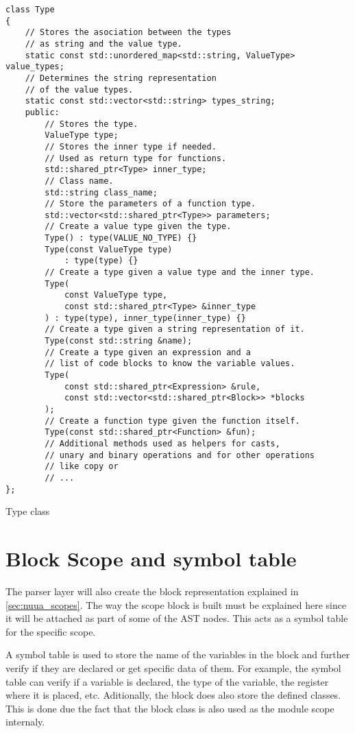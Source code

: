 \begin{listing}[H]
\begin{verbatim}
class Type
{
    // Stores the asociation between the types
    // as string and the value type.
    static const std::unordered_map<std::string, ValueType> value_types;
    // Determines the string representation
    // of the value types.
    static const std::vector<std::string> types_string;
    public:
        // Stores the type.
        ValueType type;
        // Stores the inner type if needed.
        // Used as return type for functions.
        std::shared_ptr<Type> inner_type;
        // Class name.
        std::string class_name;
        // Store the parameters of a function type.
        std::vector<std::shared_ptr<Type>> parameters;
        // Create a value type given the type.
        Type() : type(VALUE_NO_TYPE) {}
        Type(const ValueType type)
            : type(type) {}
        // Create a type given a value type and the inner type.
        Type(
            const ValueType type,
            const std::shared_ptr<Type> &inner_type
        ) : type(type), inner_type(inner_type) {}
        // Create a type given a string representation of it.
        Type(const std::string &name);
        // Create a type given an expression and a
        // list of code blocks to know the variable values.
        Type(
            const std::shared_ptr<Expression> &rule,
            const std::vector<std::shared_ptr<Block>> *blocks
        );
        // Create a function type given the function itself.
        Type(const std::shared_ptr<Function> &fun);
        // Additional methods used as helpers for casts,
        // unary and binary operations and for other operations
        // like copy or
        // ...
};
\end{verbatim}
\caption{Type class}
\label{ls:type_class}
\end{listing}

\section{Block Scope and symbol table}

The parser layer will also create the block representation explained in \autoref{sec:nuua_scopes}. The way the scope block is built must be
explained here since it will be attached as part of some of the AST nodes. This acts as a symbol table for the specific scope.

A symbol table is used to store the name of the variables in the block and further verify if they are declared or get specific data of them.
For example, the symbol table can verify if a variable is declared, the type of the variable, the register where it is placed, etc.
Aditionally, the block does also store the defined classes. This is done due the fact that the block class is also used as the module scope internaly.

